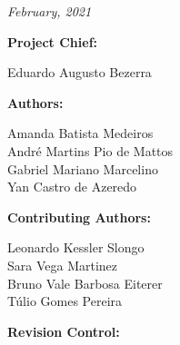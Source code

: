 %
%
%
%
%

%
%
%
%
%
%

\thispagestyle{empty}

\begin{center}

\textbf{\thetitle}

\textit{February, 2021}

\vspace{1cm}

\textbf{Project Chief:}

Eduardo Augusto Bezerra

\vspace{1cm}

\textbf{Authors:}

Amanda Batista Medeiros \\
André Martins Pio de Mattos \\
Gabriel Mariano Marcelino \\
Yan Castro de Azeredo \\

\vspace{1cm}

\textbf{Contributing Authors:}

Leonardo Kessler Slongo \\
Sara Vega Martinez \\
Bruno Vale Barbosa Eiterer \\
Túlio Gomes Pereira \\

\vspace{1cm}


\textbf{Revision Control:}

\end{center}

